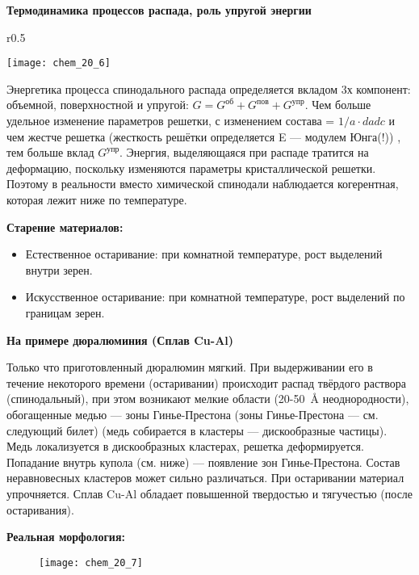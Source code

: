 \textbf{Термодинамика процессов распада, роль упругой энергии}

\begin{wrapfigure}{r}{0.5\textwidth}
    \begin{center}
        \texttt{[image: chem\_20\_6]}
    \end{center}
\end{wrapfigure}

Энергетика процесса спинодального распада определяется вкладом 3х компонент: объемной, поверхностной и упругой: $G= G^\text{об} + G^\text{пов} + G^\text{упр}$. Чем больше удельное изменение параметров решетки, с изменением состава  = $1/a \cdot da dc $ и чем жестче решетка (жесткость решётки определяется E --- модулем Юнга(!)) , тем больше вклад $ G^\text{упр}$. Энергия, выделяющаяся при распаде тратится на деформацию, поскольку изменяются параметры кристаллической решетки. Поэтому в реальности вместо химической спинодали наблюдается когерентная, которая лежит ниже по температуре. 

\textbf{Старение материалов: }
\begin{itemize}
    \item Естественное остаривание: при комнатной температуре, рост выделений внутри зерен.
    \item Искусственное остаривание: при комнатной температуре, рост выделений по границам зерен.  
\end{itemize}


\textbf{На примере дюралюминия (Сплав Cu-Al)}

Только что приготовленный дюралюмин мягкий. При выдерживании его в течение некоторого времени (остаривании) происходит распад твёрдого раствора (спинодальный), при этом возникают мелкие области (20-50~\si{\angstrom} неоднородности), обогащенные медью --- зоны Гинье-Престона (зоны Гинье-Престона --- см. следующий билет) (медь собирается в кластеры --- дискообразные частицы). Медь локализуется в дискообразных кластерах, решетка деформируется. Попадание внутрь купола (см. ниже) --- появление зон Гинье-Престона. Состав неравновесных кластеров может сильно различаться. При остаривании материал упрочняется. Сплав Cu-Al обладает повышенной твердостью и тягучестью (после остаривания).

\textbf{Реальная морфология:}

\begin{figure}[h!]
    \centering
    \texttt{[image: chem\_20\_7]}
\end{figure}


